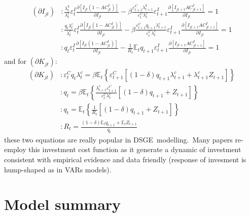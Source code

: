 \documentclass{article}%
\begin{document}
\begin{align*}
\left(  \partial I_{jt}\right)   &  :\frac{\lambda_{t}^{k}}{\lambda_{t}^{c}%
}\varepsilon_{t}^{I}\frac{\partial\left[  I_{jt}\left(  1-AC_{jt}^{I}\right)
\right]  }{\partial I_{jt}}-\beta\frac{\varepsilon_{t+1}^{C}\lambda_{t+1}^{k}%
}{\varepsilon_{t}^{C}\lambda_{t}^{c}}\varepsilon_{t+1}^{I}\frac{\partial
\left[  I_{jt+1}AC_{jt+1}^{I}\right]  }{\partial I_{jt}}=1\\
&  :\frac{q_{t}\lambda_{t}^{c}}{\lambda_{t}^{c}}\varepsilon_{t}^{I}%
\frac{\partial\left[  I_{jt}\left(  1-AC_{jt}^{I}\right)  \right]  }{\partial
I_{jt}}-\beta\frac{\varepsilon_{t+1}^{C}q_{t+1}\lambda_{t+1}^{c}}%
{\varepsilon_{t}^{C}\lambda_{t}^{c}}\varepsilon_{t+1}^{I}\frac{\partial\left[
I_{jt+1}AC_{jt+1}^{I}\right]  }{\partial I_{jt}}=1\\
&  :q_{t}\varepsilon_{t}^{I}\frac{\partial\left[  I_{jt}\left(  1-AC_{jt}%
^{I}\right)  \right]  }{\partial I_{jt}}-\frac{1}{R_{t}}\mathbb{E}_{t}%
q_{t+1}\varepsilon_{t+1}^{I}\frac{\partial\left[  I_{jt+1}AC_{jt+1}%
^{I}\right]  }{\partial I_{jt}}=1
\end{align*}
and for $\left(  \partial K_{jt}\right)  $:%
\begin{align*}
\left(  \partial K_{jt}\right)   &  :\varepsilon_{t}^{C}q_{t}\lambda_{t}%
^{c}=\beta\mathbb{E}_{t}\left\{  \varepsilon_{t+1}^{C}\left[  \overset
{}{\left(  1-\delta\right)  }q_{t+1}\lambda_{t+1}^{c}+\lambda_{t+1}^{c}%
Z_{t+1}\right]  \right\} \\
&  :q_{t}=\beta\mathbb{E}_{t}\left\{  \frac{\lambda_{t+1}^{c}\varepsilon
_{t+1}^{C}}{\varepsilon_{t}^{C}\lambda_{t}^{c}}\left[  \overset{}{\left(
1-\delta\right)  }q_{t+1}+Z_{t+1}\right]  \right\} \\
&  :q_{t}=\mathbb{E}_{t}\left\{  \frac{1}{R_{t}}\left[  \overset{}{\left(
1-\delta\right)  }q_{t+1}+Z_{t+1}\right]  \right\} \\
&  :R_{t}=\frac{\overset{}{\left(  1-\delta\right)  \mathbb{E}_{t}}%
q_{t+1}+\mathbb{E}_{t}Z_{t+1}}{q_{t}}%
\end{align*}
these two equations are really popular in DSGE\ modelling.\ Many papers
re-employ this investment cost function as it generate a dynamic of investment
consistent with empirical evidence and data friendly (response of invesment is
hump-shaped as in VARs models).

\section{Model summary}
\end{document}
